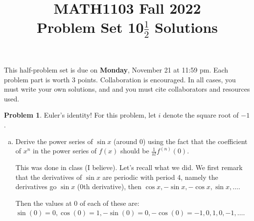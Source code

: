 \documentclass[11pt,oneside]{amsart}
\title{MATH1103 Fall 2022\\
Problem Set 10$\frac12$ Solutions}
\theoremstyle{definition}
\newtheorem{problem}{Problem}
\theoremstyle{plain}
\begin{document}
\maketitle
This half-problem set is due on \textbf{Monday}, November 21 at 11:59 pm. Each problem part is worth 3 points. Collaboration is encouraged. In all cases, you must write your own solutions, and and you must cite collaborators and resources used.

\begin{problem}
Euler's identity! For this problem, let $i$ denote the square root of $-1$.
\leavevmode\begin{enumerate}[(a)]
  \item Derive the power series of $\sin x$ (around 0) using the fact that the coefficient of $x^n$ in the power series of $f(x)$ should be $\frac 1{n!}f^{(n)}(0)$.
        \begin{solution}
          This was done in class (I believe). Let's recall what we did. We first remark that the derivatives of $\sin x$ are periodic with period 4, namely the derivatives go $\sin x$ (0th derivative), then $\cos x,-\sin x,-\cos x,\sin x,\dots$.

          Then the values at 0 of each of these are: $\sin(0)=0,\cos(0)=1,-\sin(0)=0,-\cos(0)=-1,0,1,0,-1,\dots$.


\end{solution}
\end{enumerate}
\end{problem}
\end{document}
